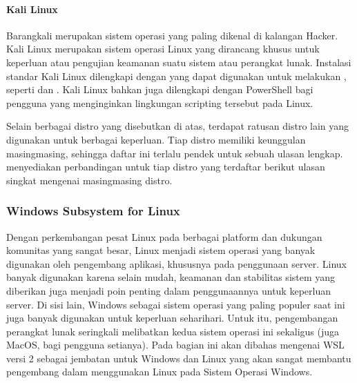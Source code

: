 \documentclass[letterpaper,10pt,english]{sphinxmanual}
\begin{document}


\paragraph{Kali Linux}
\label{\detokenize{sesi1/pengantarlinux:kali-linux}}
Barangkali  merupakan sistem operasi yang paling dikenal di kalangan Hacker. Kali Linux merupakan sistem operasi Linux yang dirancang khusus untuk keperluan  atau pengujian keamanan suatu sistem atau perangkat lunak. Instalasi standar Kali Linux dilengkapi dengan  yang dapat digunakan untuk melakukan , seperti  dan . Kali Linux bahkan juga dilengkapi dengan PowerShell bagi pengguna yang menginginkan lingkungan scripting tersebut pada Linux.


Selain berbagai distro yang disebutkan di atas, terdapat ratusan distro lain yang digunakan untuk berbagai keperluan. Tiap distro memiliki keunggulan masing\sphinxhyphen{}masing, sehingga daftar ini terlalu pendek untuk sebuah ulasan lengkap.  menyediakan perbandingan untuk tiap distro yang terdaftar berikut ulasan singkat mengenai masing\sphinxhyphen{}masing distro.


\subsubsection{Windows Subsystem for Linux}
\label{\detokenize{sesi1/pengantarlinux:windows-subsystem-for-linux}}
Dengan perkembangan pesat Linux pada berbagai platform dan dukungan komunitas yang sangat besar, Linux menjadi sistem operasi yang banyak digunakan oleh pengembang aplikasi, khususnya pada penggunaan server. Linux banyak digunakan karena selain mudah, keamanan dan stabilitas sistem yang diberikan juga menjadi poin penting dalam penggunaannya untuk keperluan server. Di sisi lain, Windows sebagai sistem operasi yang paling populer saat ini juga banyak digunakan untuk keperluan sehari\sphinxhyphen{}hari. Untuk itu, pengembangan perangkat lunak seringkali melibatkan kedua sistem operasi ini sekaligus (juga MacOS, bagi pengguna setianya). Pada bagian ini akan dibahas mengenai WSL versi 2 sebagai jembatan untuk Windows dan Linux yang akan sangat membantu pengembang dalam menggunakan Linux pada Sistem Operasi Windows.
\end{document}
